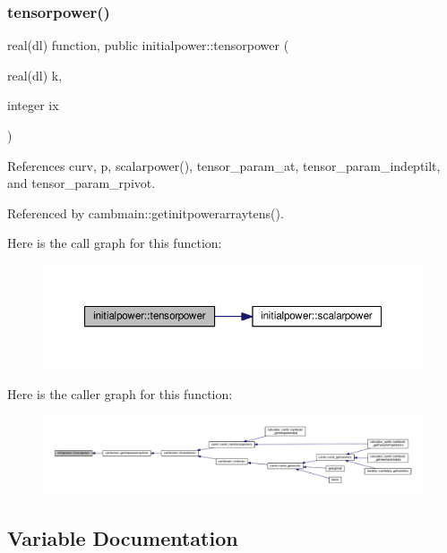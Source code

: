 \subsubsection{\texorpdfstring{tensorpower()}{tensorpower()}}
{\footnotesize\ttfamily real(dl) function, public initialpower\+::tensorpower (\begin{DoxyParamCaption}\item[{real(dl)}]{k,  }\item[{integer}]{ix }\end{DoxyParamCaption})}



References curv, p, scalarpower(), tensor\+\_\+param\+\_\+at, tensor\+\_\+param\+\_\+indeptilt, and tensor\+\_\+param\+\_\+rpivot.



Referenced by cambmain\+::getinitpowerarraytens().

Here is the call graph for this function\+:
\nopagebreak
\begin{figure}[H]
\begin{center}
\leavevmode
\includegraphics[width=350pt]{namespaceinitialpower_aa1fdc1f3bcc69e61d7f690fa3ffd7f02_cgraph}
\end{center}
\end{figure}
Here is the caller graph for this function\+:
\nopagebreak
\begin{figure}[H]
\begin{center}
\leavevmode
\includegraphics[width=350pt]{namespaceinitialpower_aa1fdc1f3bcc69e61d7f690fa3ffd7f02_icgraph}
\end{center}
\end{figure}


\subsection{Variable Documentation}
\mbox{\label{namespaceinitialpower_a3a06e0904c8fdd21de5ce19490bb177b}} 
